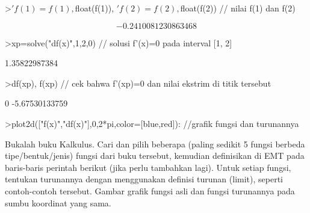 \documentclass[a4paper,10pt]{article}
\begin{document}
\begin{eulernotebook}
\begin{eulercomment}
\begin{eulercomment}
\begin{eulercomment}
\begin{eulercomment}
\begin{eulercomment}
\begin{eulercomment}
\begin{eulercomment}
\begin{eulercomment}
\begin{eulercomment}
\begin{eulercomment}
\begin{euleroutput}
\end{euleroutput}
\begin{eulerprompt}
>$'f(1)=f(1), $float(f(1)), $'f(2)=f(2), $float(f(2)) // nilai f(1) dan f(2)
\end{eulerprompt}
\begin{eulerformula}
\[
-0.2410081230863468
\]
\end{eulerformula}
\begin{eulerprompt}
>xp=solve("df(x)",1,2,0) // solusi f’(x)=0 pada interval [1, 2]
\end{eulerprompt}
\begin{euleroutput}
  1.35822987384
\end{euleroutput}
\begin{eulerprompt}
>df(xp), f(xp) // cek bahwa f’(xp)=0 dan nilai ekstrim di titik tersebut
\end{eulerprompt}
\begin{euleroutput}
  0
  -5.67530133759
\end{euleroutput}
\begin{eulerprompt}
>plot2d(["f(x)","df(x)"],0,2*pi,color=[blue,red]): //grafik fungsi dan turunannya
\end{eulerprompt}
\begin{eulercomment}
Bukalah buku Kalkulus. Cari dan pilih beberapa (paling sedikit 5
fungsi berbeda tipe/bentuk/jenis) fungsi dari buku tersebut, kemudian
definisikan di EMT pada baris-baris perintah berikut (jika perlu
tambahkan lagi). Untuk setiap fungsi, tentukan turunannya dengan
menggunakan definisi turunan (limit), seperti contoh-contoh tersebut.
Gambar grafik fungsi asli dan fungsi turunannya pada sumbu koordinat
yang sama.


\end{eulercomment}
\end{eulercomment}
\end{eulercomment}
\end{eulercomment}
\end{eulercomment}
\end{eulercomment}
\end{eulercomment}
\end{eulercomment}
\end{eulercomment}
\end{eulercomment}
\end{eulercomment}
\end{eulernotebook}
\end{document}

